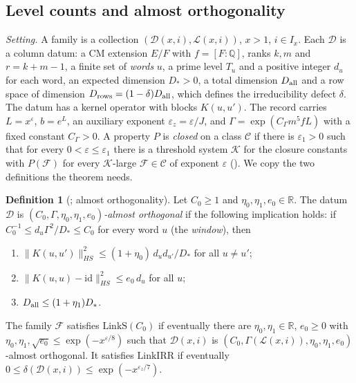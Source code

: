 \documentclass[10pt]{amsart}
\theoremstyle{definition}
\newtheorem{definition}[theorem]{Definition}
\theoremstyle{remark}
\newcommand{\R}{\mathbb R}
\newcommand{\Q}{\mathbb Q}
\begin{document}
\subsection{Level counts and almost orthogonality}\label{inp:ssec-counts}

\emph{Setting.} A family is a collection $(\mathcal D(x,i),\mathcal
L(x,i))$, $x>1$, $i\in I_x$. Each $\mathcal D$ is a column datum: a CM
extension $E/F$ with $f=[F:\Q]$, ranks $k,m$ and $r=k+m-1$, a finite set of
\emph{words} $u$, a prime level $T_u$ and a positive integer $d_u$ for each
word, an expected dimension $D_*>0$, a total dimension $D_{\rm all}$ and a
row space of dimension $D_{\rm rows}=(1-\delta)D_{\rm all}$, which defines
the irreducibility defect $\delta$. The datum has a kernel operator with
blocks $K(u,u')$. The record carries $L=x^\varepsilon$, $b=e^L$, an
auxiliary exponent $\varepsilon_z=\varepsilon/J$, and
$\Gamma=\exp(C_\Gamma m^5fL)$ with a fixed constant $C_\Gamma>0$. A
property $P$ is \emph{closed} on a class $\mathcal C$ if there is
$\varepsilon_1>0$ such that for every $0<\varepsilon\le\varepsilon_1$ there
is a threshold system $\mathcal K$ for the closure constants with
$P(\mathcal F)$ for every $\mathcal K$-large $\mathcal F\in\mathcal C$ of
exponent $\varepsilon$ (\cite[\S\ref{A-i3:ssec-setting}]{Annex}). We copy the
two definitions the theorem needs.

\begin{definition}[{\cite[Definition~\ref{A-i3:def-linkS}]{Annex}}; almost orthogonality]\label{inp:def-linkS}
Let $C_0\ge1$ and $\eta_0,\eta_1,e_0\in\R$.  The datum $\mathcal D$ is
\emph{$(C_0,\Gamma,\eta_0,\eta_1,e_0)$-almost orthogonal} if the following
implication holds: if $C_0^{-1}\le d_u\Gamma^2/D_*\le C_0$ for every word $u$
(the \emph{window}), then
\begin{enumerate}
\item[(i)] $\|K(u,u')\|_{HS}^2\le(1+\eta_0)\,d_ud_{u'}/D_*$ for all $u\ne u'$;
\item[(ii)] $\|K(u,u)-\mathrm{id}\|_{HS}^2\le e_0\,d_u$ for all $u$;
\item[(iii)] $D_{\rm all}\le(1+\eta_1)D_*$.
\end{enumerate}
The family $\mathcal F$ satisfies $\mathrm{LinkS}(C_0)$ if eventually there
are $\eta_0,\eta_1\in\R$, $e_0\ge0$ with
$\eta_0,\eta_1,\sqrt{e_0}\le\exp(-x^{\varepsilon/8})$ such that
$\mathcal D(x,i)$ is $(C_0,\Gamma(\mathcal L(x,i)),\eta_0,\eta_1,e_0)$-almost
orthogonal.  It satisfies $\mathrm{LinkIRR}$ if eventually
$0\le\delta(\mathcal D(x,i))\le\exp(-x^{\varepsilon_z/7})$.
\end{definition}
\end{document}
